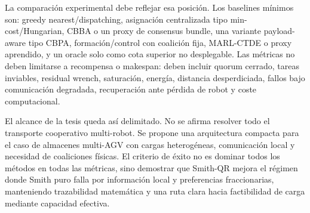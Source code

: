 La comparación experimental debe reflejar esa posición. Los baselines mínimos son:
greedy nearest/dispatching, asignación centralizada tipo min-cost/Hungarian, CBBA o un
proxy de consensus bundle, una variante payload-aware tipo CBPA, formación/control con
coalición fija, MARL-CTDE o proxy aprendido, y un oracle solo como cota superior no
desplegable. Las métricas no deben limitarse a recompensa o makespan: deben incluir
quorum cerrado, tareas inviables, residual wrench, saturación, energía, distancia
desperdiciada, fallos bajo comunicación degradada, recuperación ante pérdida de robot y
coste computacional.

El alcance de la tesis queda así delimitado. No se afirma resolver todo el transporte
cooperativo multi-robot. Se propone una arquitectura compacta para el caso de almacenes
multi-AGV con cargas heterogéneas, comunicación local y necesidad de coaliciones físicas.
El criterio de éxito no es dominar todos los métodos en todas las métricas, sino demostrar
que Smith-QR mejora el régimen donde Smith puro falla por información local y preferencias
fraccionarias, manteniendo trazabilidad matemática y una ruta clara hacia factibilidad de
carga mediante capacidad efectiva.

